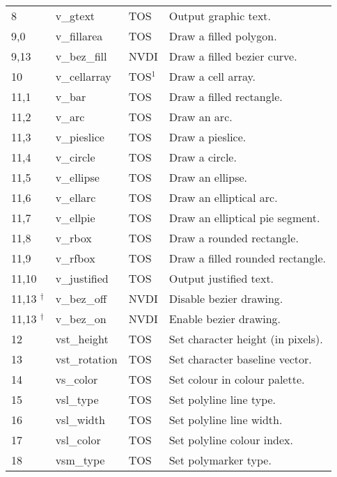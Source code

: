 \documentclass[a4paper]{article}
\begin{document}
\begin{supertabular}{|p{1.8cm}|p{3.0cm}|p{1.5cm}|p{8.7cm}|}
8               & v\_gtext            & TOS   & Output graphic text. \\
9,0             & v\_fillarea         & TOS   & Draw a filled polygon. \\
9,13            & v\_bez\_fill        & NVDI  & Draw a filled bezier curve. \\
10              & v\_cellarray        & TOS$^1$       & Draw a cell array. \\
11,1            & v\_bar              & TOS   & Draw a filled rectangle. \\
11,2            & v\_arc              & TOS   & Draw an arc. \\
11,3            & v\_pieslice         & TOS   & Draw a pieslice. \\
11,4            & v\_circle           & TOS   & Draw a circle. \\
11,5            & v\_ellipse          & TOS   & Draw an ellipse. \\
11,6            & v\_ellarc           & TOS   & Draw an elliptical arc. \\
11,7            & v\_ellpie           & TOS   & Draw an elliptical pie segment. \\
11,8            & v\_rbox             & TOS   & Draw a rounded rectangle. \\
11,9            & v\_rfbox            & TOS   & Draw a filled rounded rectangle. \\
11,10           & v\_justified        & TOS   & Output justified text. \\
11,13 $^\dag$   & v\_bez\_off         & NVDI  & Disable bezier drawing. \\
11,13 $^\dag$   & v\_bez\_on          & NVDI  & Enable bezier drawing. \\
12              & vst\_height         & TOS   & Set character height (in pixels). \\
13              & vst\_rotation       & TOS   & Set character baseline vector. \\
14              & vs\_color           & TOS   & Set colour in colour palette. \\
15              & vsl\_type           & TOS   & Set polyline line type. \\
16              & vsl\_width          & TOS   & Set polyline line width. \\
17              & vsl\_color          & TOS   & Set polyline colour index. \\
18              & vsm\_type           & TOS   & Set polymarker type. \\

\end{supertabular}
\end{document}
